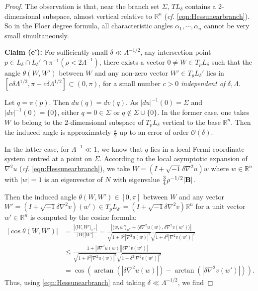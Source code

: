 \documentclass[11pt,a4paper]{article}
\numberwithin{equation}{section}%
\theoremstyle{definition}
\newcommand{\cf}{\emph{cf.} }
\newcommand{\R}{\mathbb{R}}
\newcommand{\C}{\mathbb{C}}
\begin{document}
\begin{proof}
The observation is that, near the branch set $\Sigma$, $TL_\delta$ contains a 2-dimensional subspace, almost vertical relative to $\R^n$ (\cf \ref{eqn:Hessunearbranch}). So in the Floer degree formula, all characteristic angles $\alpha_1,\cdots,\alpha_n$ cannot be very small simultaneously.  

\textbf{Claim (e'):} For sufficiently small $\delta\ll \Lambda^{-1/2}$, any intersection point $p\in L_\delta\cap L_\delta'\cap \pi^{-1}(\rho <2\Lambda^{-1})$, there exists a vector $0\neq W\in T_pL_\delta$ such that the angle $\theta (W,W')$ between $W$ and any non-zero vector $W'\in T_pL_{\delta}'$ lies in $[c\delta\Lambda^{1/2},\pi -c\delta\Lambda^{1/2} ]\subset (0,\pi)$, for a small number $c>0$ \textit{independent of} $\delta,\Lambda$.   

Let $q=\pi(p)$. Then $du(q)=dv(q)$. As $|du|^{-1}(0)=\Sigma$ and $|dv|^{-1}(0)=\{0\}$, either $q=0\in \Sigma$ or $q\notin \Sigma\cup \{0\}$. In the former case, one takes $W$ to belong to the $2$-dimensional subspace of $T_pL_\delta$ vertical to the base $\R^n$. Then the induced angle is approximately $\frac{\pi}{2}$ up to an error of order $\mathcal{O}(\delta)$. 

In the latter case, for $\Lambda^{-1}\ll 1$, we know that $q$ lies in a local Fermi coordinate system centred at a point on $\Sigma$. According to the local asymptotic expansion of $\nabla^2u$ (\cf \ref{eqn:Hessunearbranch}), we take $W=(I+\sqrt{-1}\delta \nabla^2u)w$ where $w\in \R^n$ with $|w|=1$ is an eigenvector of $N$ with eigenvalue $\frac{3}{4}\rho^{-1/2}|{\bf{B}}|$.  

Then the induced angle $\theta(W,W')\in [0,\pi]$ between $W$ and any vector $W'=(I+\sqrt{-1}\delta \nabla^2v)(w')\in T_pL_{\delta'}=(I+\sqrt{-1}\delta \nabla^2v)\R^n$ for a unit vector $w'\in \R^n$ is computed by the cosine formula:
\begin{equation*}
    \begin{aligned}
        |\cos\theta(W,W')|&=\frac{|\langle W,W'\rangle_{\C^n}|}{|W||W'|}=\frac{|\langle w,w'\rangle_{\R^n}+\langle \delta\nabla^2u(w), \delta\nabla^2v(w')\rangle|}{\sqrt{1+\delta^2|\nabla^2 u(w)|^2}\sqrt{1+\delta^2|\nabla^2v(w')|^2}}\\&\leqslant \frac{1+|\delta\nabla^2u(w)||\delta\nabla^2v(w')|}{\sqrt{1+\delta^2|\nabla^2 u(w)|^2}\sqrt{1+\delta^2|\nabla^2v(w')|^2}}\\&=\cos(\arctan(|\delta\nabla^2u(w)|)-\arctan (|\delta \nabla^2v(w')|)).
    \end{aligned}
\end{equation*}
Thus, using \eqref{eqn:Hessunearbranch} and taking $\delta \ll \Lambda^{-1/2}$, we find


\end{proof}
\end{document}
